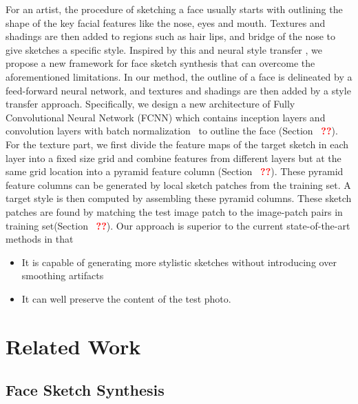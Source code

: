 \documentclass[10pt,twocolumn,letterpaper]{article}
\def\red[#1]{\textcolor{red}{\textbf{#1}}}
\begin{document}
For an artist, the procedure of sketching a face usually starts with outlining the shape of the key facial features like the nose, eyes and mouth. Textures and shadings are then added to regions such as hair lips, and bridge of the nose to give sketches a specific style. Inspired by this and neural style transfer \cite{gatys2015texture}, we propose a new framework for face sketch synthesis that can overcome the aforementioned limitations. In our method, the outline of a face is delineated by a feed-forward neural network, and textures and shadings are then added by a style transfer approach. Specifically, we design a new architecture of Fully Convolutional Neural Network (FCNN) which contains inception layers \cite{szegedy2015going} and convolution layers with batch normalization~\cite{Sergey2015batch} to outline the face (Section ~\red[??]). For the texture part, we first divide the feature maps of the target sketch in each layer into a fixed size grid and combine features from different layers but at the same grid location into a pyramid feature column (Section ~\red[??]). These pyramid feature columns can be generated by local sketch patches from the training set. A target style is then computed by assembling these pyramid columns. These sketch patches are found by matching the test image patch to the image-patch pairs in training set(Section ~\red[??]). Our approach is superior to the current state-of-the-art methods in that 
\begin{itemize}
\item It is capable of generating more stylistic sketches without introducing over smoothing artifacts 
\item It can well preserve the content of the test photo.
\end{itemize}

\section{Related Work}\label{sec:related_work}

\subsection{Face Sketch Synthesis}
\end{document}

